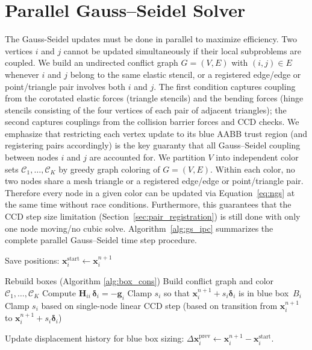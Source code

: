 \documentclass[acmtog,anonymous,review]{acmart}
\begin{document}
\section{Parallel Gauss--Seidel Solver}
\label{sec:solver}
The Gauss-Seidel updates must be done in parallel to maximize efficiency.
Two vertices $i$ and $j$ cannot be updated simultaneously if their local subproblems are coupled. 
We build an undirected conflict graph $G=(V,E)$ with $(i,j)\in E$ whenever $i$ and $j$ belong to the
same elastic stencil, or a registered edge/edge or point/triangle pair involves both $i$ and $j$. 
The first condition captures coupling from the corotated elastic forces (triangle stencils) and the bending forces (hinge stencils consisting of the four vertices of each pair of adjacent triangles); the second captures couplings from the collision barrier forces and CCD checks.
We emphasize that restricting each vertex update to its blue AABB trust region (and registering pairs accordingly) is the key guaranty that all Gauss--Seidel coupling between nodes $i$ and $j$ are accounted for.
We partition $V$ into independent color sets $\mathcal{C}_1,\dots,\mathcal{C}_K$ by greedy graph coloring of $G=(V,E)$. 
Within each color, no two nodes share a mesh triangle or a registered edge/edge or point/triangle pair.
Therefore every node in a given color can be updated via Equation~\eqref{eq:ngs} at the same time without race conditions.
Furthermore, this guarantees that the CCD step size limitation (Section~\ref{sec:pair_registration}) is still done with only one node moving/no cubic solve. Algorithm~\ref{alg:gs_ipc} summarizes the complete parallel Gauss--Seidel time step
procedure. 

\begin{algorithm}[!ht]
\caption{Parallel CCD Trust Region Gauss--Seidel}
\label{alg:gs_ipc}
\begin{algorithmic}[1]

\STATE Save positions: $\mathbf{x}_i^{\mathrm{start}} \leftarrow \mathbf{x}^{n+1}_i$

  \STATE Rebuild boxes (Algorithm \ref{alg:box_cons})\;
  \STATE Build conflict graph and color\;
  \ENDIF
  $\mathcal{C}_1,\dots,\mathcal{C}_K$
      \STATE Compute
      $\mathbf{H}_{ii}\,\boldsymbol{\delta}_i
      = -\mathbf{g}_{i}$
      \STATE Clamp $s_i$ so that
      $\mathbf{x}^{n+1}_i + s_i\boldsymbol{\delta}_i$
      is in \textcolor{blue!70!black}{blue box}~$B_i$
      \STATE Clamp $s_i$ based on single-node linear CCD step (based on transition from $\mathbf{x}^{n+1}_i$ to $\mathbf{x}^{n+1}_i + s_i\boldsymbol{\delta}_i$)
    \ENDFOR
  \ENDFOR
\ENDFOR

\STATE Update displacement history for blue box sizing:\;
  $\Delta\mathbf{x}_i^{\mathrm{prev}} \leftarrow
  \mathbf{x}^{n+1}_i - \mathbf{x}_i^{\mathrm{start}}$.
\end{algorithmic}
\end{algorithm}
\end{document}
